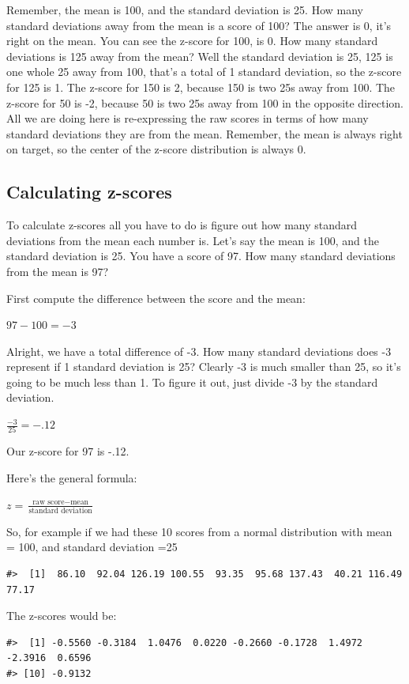\documentclass[
  letterpaper,
  DIV=11,
  numbers=noendperiod]{scrreprt}
\begin{document}
Remember, the mean is 100, and the standard deviation is 25. How many
standard deviations away from the mean is a score of 100? The answer is
0, it's right on the mean. You can see the z-score for 100, is 0. How
many standard deviations is 125 away from the mean? Well the standard
deviation is 25, 125 is one whole 25 away from 100, that's a total of 1
standard deviation, so the z-score for 125 is 1. The z-score for 150 is
2, because 150 is two 25s away from 100. The z-score for 50 is -2,
because 50 is two 25s away from 100 in the opposite direction. All we
are doing here is re-expressing the raw scores in terms of how many
standard deviations they are from the mean. Remember, the mean is always
right on target, so the center of the z-score distribution is always 0.

\subsection{Calculating z-scores}\label{calculating-z-scores}

To calculate z-scores all you have to do is figure out how many standard
deviations from the mean each number is. Let's say the mean is 100, and
the standard deviation is 25. You have a score of 97. How many standard
deviations from the mean is 97?

First compute the difference between the score and the mean:

\(97-100 = -3\)

Alright, we have a total difference of -3. How many standard deviations
does -3 represent if 1 standard deviation is 25? Clearly -3 is much
smaller than 25, so it's going to be much less than 1. To figure it out,
just divide -3 by the standard deviation.

\(\frac{-3}{25} = -.12\)

Our z-score for 97 is -.12.

Here's the general formula:

\(z = \frac{\text{raw score} - \text{mean}}{\text{standard deviation}}\)

So, for example if we had these 10 scores from a normal distribution
with mean = 100, and standard deviation =25

\begin{verbatim}
#>  [1]  86.10  92.04 126.19 100.55  93.35  95.68 137.43  40.21 116.49  77.17
\end{verbatim}

The z-scores would be:

\begin{verbatim}
#>  [1] -0.5560 -0.3184  1.0476  0.0220 -0.2660 -0.1728  1.4972 -2.3916  0.6596
#> [10] -0.9132
\end{verbatim}
\end{document}
